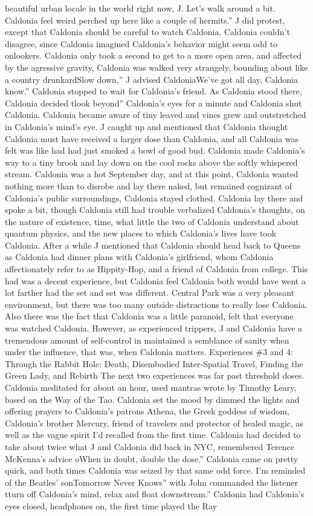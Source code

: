 \documentclass[12pt]{book}
\begin{document}
beautiful urban locale in the world right now, J. Let's walk around a bit. Caldonia feel weird perched up here like a couple of hermits.'' J did protest, except that Caldonia should be careful to watch Caldonia. Caldonia couldn't disagree, since Caldonia imagined Caldonia's behavior might seem odd to onlookers. Caldonia only took a second to get to a more open area, and affected by the agressive gravity, Caldonia was walked very strangely, bounding about like a country drunkardSlow down,'' J advised CaldoniaWe've got all day, Caldonia know.'' Caldonia stopped to wait for Caldonia's friend. As Caldonia stood there, Caldonia decided tlook beyond'' Caldonia's eyes for a minute and Caldonia shut Caldonia. Caldonia became aware of tiny leaved and vines grew and outstretched in Caldonia's mind's eye. J caught up and mentioned that Caldonia thought Caldonia must have received a larger dose than Caldonia, and all Caldonia was felt was like had had just smoked a bowl of good bud. Caldonia made Caldonia's way to a tiny brook and lay down on the cool rocks above the softly whispered stream. Caldonia was a hot September day, and at this point, Caldonia wanted nothing more than to disrobe and lay there naked, but remained cognizant of Caldonia's public surroundings, Caldonia stayed clothed. Caldonia lay there and spoke a bit, though Caldonia still had trouble verbalized Caldonia's thoughts, on the nature of existence, time, what little the two of Caldonia understand about quantum physics, and the new places to which Caldonia's lives have took Caldonia. After a while J mentioned that Caldonia should head back to Queens as Caldonia had dinner plans with Caldonia's girlfriend, whom Caldonia affectionately refer to as Hippity-Hop, and a friend of Caldonia from college. This had was a decent experience, but Caldonia feel Caldonia both would have went a lot farther had the set and set was different. Central Park was a very pleasant environment, but there was too many outside distractions to really lose Caldonia. Also there was the fact that Caldonia was a little paranoid, felt that everyone was watched Caldonia. However, as experienced trippers, J and Caldonia have a tremendous amount of self-control in maintained a semblance of sanity when under the influence, that was, when Caldonia matters. Experiences \#3 and 4: Through the Rabbit Hole: Death, Disembodied Inter-Spatial Travel, Finding the Green Lady, and Rebirth The next two experiences was far past threshold doses. Caldonia meditated for about an hour, used mantras wrote by Timothy Leary, based on the Way of the Tao. Caldonia set the mood by dimmed the lights and offering prayers to Caldonia's patrons Athena, the Greek goddess of wisdom, Caldonia's brother Mercury, friend of travelers and protector of healed magic, as well as the vague spirit I'd recalled from the first time. Caldonia had decided to take about twice what J and Caldonia did back in NYC, remembered Terence McKenna's advice oWhen in doubt, double the dose.'' Caldonia came on pretty quick, and both times Caldonia was seized by that same odd force. I'm reminded of the Beatles' sonTomorrow Never Knows'' with John commanded the listener tturn off Caldonia's mind, relax and float downstream.'' Caldonia had Caldonia's eyes closed, headphones on, the first time played the Ray 
\end{document}
